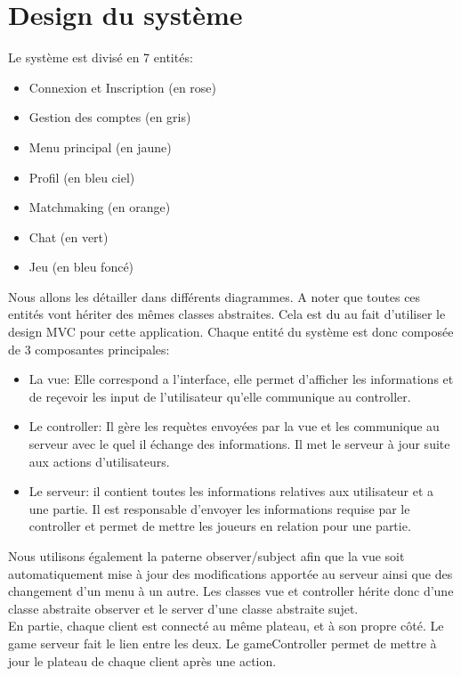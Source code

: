 \documentclass[../design_fonctionnement_sys.tex]{subfiles}
\begin{document}
\section{Design du système}
Le système est divisé en 7 entités:
\begin{itemize}
    \item Connexion et Inscription (en rose)
    \item Gestion des comptes (en gris)
    \item Menu principal (en jaune)
    \item Profil (en bleu ciel)
    \item Matchmaking (en orange)
    \item Chat (en vert)
    \item Jeu (en bleu foncé)
    \newline
\end{itemize}

Nous allons les détailler dans différents diagrammes. A noter que toutes ces entités vont hériter des mêmes classes abstraites.
Cela est du au fait d'utiliser le design MVC pour cette application.
Chaque entité du système est donc composée de 3 composantes principales:
\begin{itemize}
    \item La vue: Elle correspond a l'interface, elle permet d'afficher les informations 
    et de reçevoir les input de l'utilisateur qu'elle communique au controller.
    \item Le controller: Il gère les requètes envoyées par la vue et les communique au serveur avec le quel il échange des informations.
    Il met le serveur à jour suite aux actions d'utilisateurs.
    \item Le serveur: il contient toutes les informations relatives aux utilisateur et a une partie. 
    Il est responsable d'envoyer les informations requise par le controller et permet de mettre les joueurs en relation pour une partie.\\
\end{itemize}

Nous utilisons également la paterne observer/subject afin que la vue soit 
automatiquement mise à jour des modifications apportée au serveur ainsi que des changement d'un menu à un autre.
Les classes vue et controller hérite donc d'une classe abstraite observer et le server d'une classe abstraite sujet.\\
En partie, chaque client est connecté au même plateau, et à son propre côté. Le game serveur fait le lien entre les deux.
Le gameController permet de mettre à jour le plateau de chaque client après une action.
\end{document}
